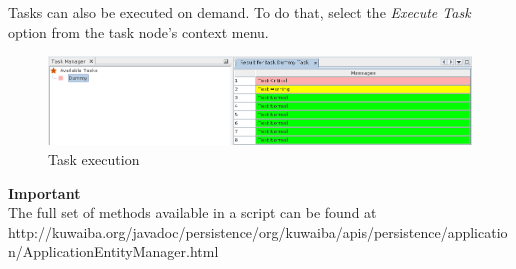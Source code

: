 \documentclass[a4paper]{article}
\begin{document}
		Tasks can also be executed on demand. To do that, select the \textit{Execute Task} option from the task node's context menu.
		\begin{figure}[h!]
			\centering
			\includegraphics[width=1.1\linewidth]{img/task_manager_execute_task.png}
			\caption{Task execution}
			\label{fig:task_manager_execute_task}
		\end{figure}
		\begin{framed} {\large \textbf{Important}}\\
			The full set of methods available in a script can be found at \\ \tiny{http://kuwaiba.org/javadoc/persistence/org/kuwaiba/apis/persistence/application/ApplicationEntityManager.html}
		\end{framed}
	\newpage
\end{document}
